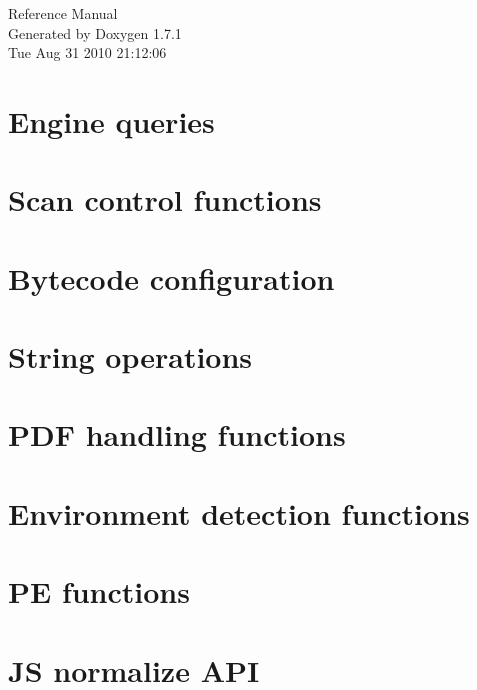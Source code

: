 \documentclass[a4paper]{article}
\begin{document}
\hypersetup{pageanchor=false}
\begin{titlepage}
\vspace*{7cm}
\begin{center}
{\Large Reference Manual}\\
\vspace*{1cm}
{\large Generated by Doxygen 1.7.1}\\
\vspace*{0.5cm}
{\small Tue Aug 31 2010 21:12:06}\\
\end{center}
\end{titlepage}
\tableofcontents
{}
\hypersetup{pageanchor=true}
\section{Engine queries}
\label{engineq}
\hypertarget{engineq}{}

\section{Scan control functions}
\label{scanc}
\hypertarget{scanc}{}

\section{Bytecode configuration}
\label{config}
\hypertarget{config}{}

\section{String operations}
\label{stringops}
\hypertarget{stringops}{}

\section{PDF handling functions}
\label{pdfg}
\hypertarget{pdfg}{}

\section{Environment detection functions}
\label{envdet}
\hypertarget{envdet}{}

\section{PE functions}
\label{pe}
\hypertarget{pe}{}

\section{JS normalize API}
\label{js}
\hypertarget{js}{}

\end{document}
